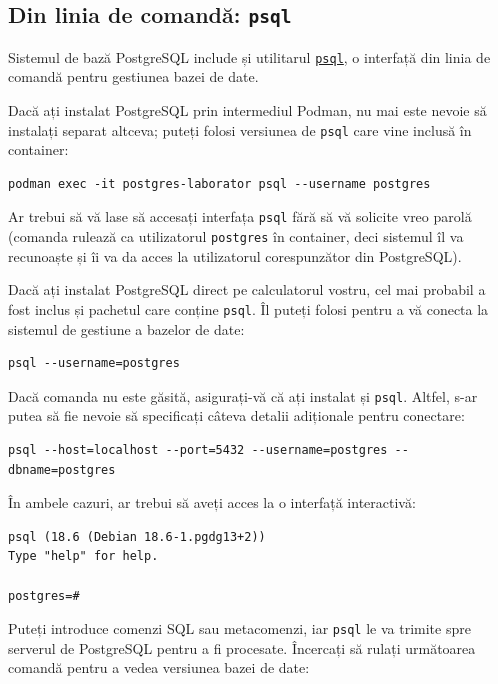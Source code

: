 \documentclass[a4paper, 12pt]{article}
\begin{document}
\subsection{Din linia de comandă: \texttt{psql}}

Sistemul de bază PostgreSQL include și utilitarul \href{https://www.postgresql.org/docs/current/app-psql.html}{\texttt{psql}}, o interfață din linia de comandă pentru gestiunea bazei de date.

Dacă ați instalat PostgreSQL prin intermediul Podman, nu mai este nevoie să instalați separat altceva; puteți folosi versiunea de \texttt{psql} care vine inclusă în container:

\begin{verbatim}
podman exec -it postgres-laborator psql --username postgres
\end{verbatim}

Ar trebui să vă lase să accesați interfața \texttt{psql} fără să vă solicite vreo parolă (comanda rulează ca utilizatorul \texttt{postgres} în container, deci sistemul îl va recunoaște și îi va da acces la utilizatorul corespunzător din PostgreSQL).

Dacă ați instalat PostgreSQL direct pe calculatorul vostru, cel mai probabil a fost inclus și pachetul care conține \texttt{psql}. Îl puteți folosi pentru a vă conecta la sistemul de gestiune a bazelor de date:

\begin{verbatim}
psql --username=postgres
\end{verbatim}

Dacă comanda nu este găsită, asigurați-vă că ați instalat și \texttt{psql}. Altfel, s-ar putea să fie nevoie să specificați câteva detalii adiționale pentru conectare:

\begin{verbatim}
psql --host=localhost --port=5432 --username=postgres --dbname=postgres
\end{verbatim}

În ambele cazuri, ar trebui să aveți acces la o interfață interactivă:

\begin{verbatim}
psql (18.6 (Debian 18.6-1.pgdg13+2))
Type "help" for help.

postgres=#
\end{verbatim}

Puteți introduce comenzi SQL sau metacomenzi, iar \texttt{psql} le va trimite spre serverul de PostgreSQL pentru a fi procesate. Încercați să rulați următoarea comandă pentru a vedea versiunea bazei de date:
\end{document}
